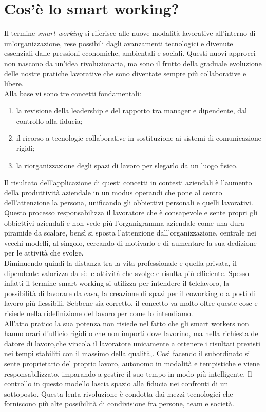 
\section{Cos'è lo smart working?}
Il termine \textit{smart working} si riferisce alle nuove modalità lavorative all'interno di \mbox{un'organizzazione}, rese possibili dagli avanzamenti tecnologici e divenute essenziali dalle pressioni economiche, ambientali e sociali. Questi nuovi approcci non nascono da un'idea rivoluzionaria, ma sono il frutto della graduale evoluzione delle nostre pratiche lavorative che sono diventate sempre più collaborative e libere. \\Alla base vi sono tre concetti fondamentali:
\begin{enumerate}
	\item la revisione della leadership e del rapporto tra manager e dipendente, dal controllo alla fiducia;
	\item il ricorso a tecnologie collaborative in sostituzione ai sistemi di comunicazione rigidi;
	\item la riorganizzazione degli spazi di lavoro per slegarlo da un luogo fisico.
\end{enumerate}
\newpage
Il risultato dell'applicazione di questi concetti in contesti aziendali è l'aumento della produttività aziendale in un modus operandi che pone al centro dell'attenzione la persona, unificando gli obbiettivi personali e quelli lavorativi. Questo processo responsabilizza il lavoratore che è consapevole e sente propri gli obbiettivi aziendali e non vede più l'organigramma aziendale come una dura piramide da scalare, bensì si sposta l'attenzione dall'organizzazione, centrale nei vecchi modelli, al singolo, cercando di motivarlo e di aumentare la sua dedizione per le attività che svolge.\\
Diminuendo quindi la distanza tra la vita professionale e quella privata, il dipendente valorizza da sè le attività che svolge e risulta più efficiente.
Spesso infatti il termine smart working si utilizza per intendere il telelavoro, la possibilità di lavorare da casa, la creazione di spazi per il coworking o a posti di lavoro più flessibili. Sebbene sia corretto, il concetto va molto oltre queste cose e risiede nella ridefinizione del lavoro per come lo intendiamo.\\ All'atto pratico la sua potenza non risiede nel fatto che gli smart workers non hanno orari d'ufficio rigidi o che non importi dove lavorino, ma nella richiesta del datore di \mbox{lavoro},che vincola il lavoratore unicamente a ottenere i risultati previsti nei tempi stabiliti con il massimo della qualità,. Così facendo il subordinato si sente proprietario del proprio lavoro, autonomo in modalità e tempistiche e viene responsabilizzato, imparando a gestire il suo tempo in modo più intelligente. Il controllo in questo modello lascia spazio alla fiducia nei confronti di un sottoposto. Questa lenta rivoluzione è condotta dai mezzi tecnologici che forniscono più alte possibilità di condivisione fra persone, team e società.\\
